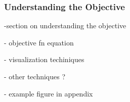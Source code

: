 \subsubsection*{Understanding the Objective}
-section on understanding the objective

    - objective fn equation

    - visualization techiniques

    - other techniques ?

    - example figure in appendix

